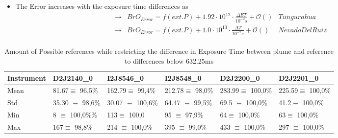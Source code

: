 \documentclass  [
  paper    = a4,
  BCOR     = 10mm,
  twoside,
  fontsize = 12pt,
  fleqn,
  toc      = bibnumbered,
  toc      = listofnumbered,
  numbers  = noendperiod,
  headings = normal,
  listof   = leveldown,
  version  = 3.03
]                                       {scrreprt}
\begin{document}
	\begin{itemize}
		\item The  Error increases with the exposure time differences as\\
		\begin{align*}
		\rightarrow&  BrO_{Error} = f(ext. P)+ 1.92\cdot10^{12}\cdot\frac{\Delta ET}{10^{-2}s} + \mathcal{O}\left(\right) & Tungurahua\\
		\rightarrow&  BrO_{Error} = f(ext. P)+ 1.0\cdot10^{13}\cdot\frac{\Delta T}{10^{-2}s} + \mathcal{O}\left(\right) & Nevado Del Ruiz\\
		\end{align*}
	\end{itemize}
	\begin{table}
	\begin{tabular}{|p{2cm}|p{2cm}|p{2cm}|p{2cm}|p{2cm}|p{2cm}|}
		Instrument	&D2J2140\_0&I2J8546\_0& I2J8548\_0&D2J2200\_0&D2J2201\_0\\
		\toprule
		Mean&
		81.67$\equiv$ 96,5\%		&162.79$\equiv$ 99,4\%		&212.78$\equiv$ 98,0\%		&283.99$\equiv$ 100,0\%		&225.59$\equiv$ 100,0\% \\
		\midrule
		Std&
		35.30 $\equiv$	98,6\%&		30.07 $\equiv$	100,6\%&
		64.47 $\equiv$	99,5\% &		69.5 $\equiv$	100,0\% &
		41.2$\equiv$	100,0\% \\
		\midrule
		Min  &
		8 $\equiv$	100,0\%\%&113$\equiv$	100,0
		&95 $\equiv$	97,9\%
		&64$\equiv$	100,0\%
		&63$\equiv$	100,0\%\\
		\midrule
		Max&
		167$\equiv$	98,8\% &
		214 $\equiv$	100,0\% &
		395 $\equiv$	99,0\% &
		433 $\equiv$	100,0\%  &
		297 $\equiv$	100,0\% \\
		\bottomrule
	\end{tabular}
	\caption{Amount of Possible references while restricting the difference in Exposure Time  between plume and reference to differences below 632.25ms}
	\label{tab:etrest}
\end{table}	
\end{document}
